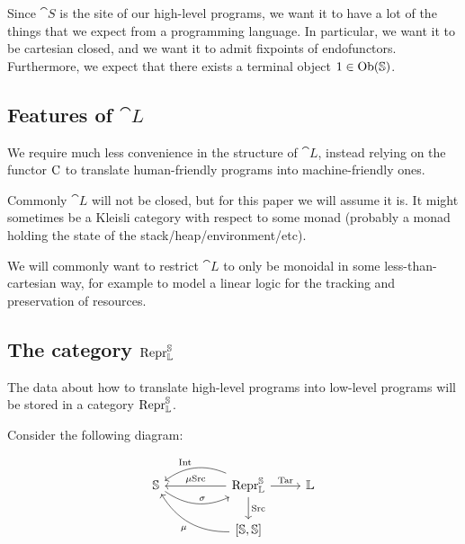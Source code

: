 Since $\cat S$ is the site of our high-level programs, we want it to have a lot
of the things that we expect from a programming language. In particular, we
want it to be cartesian closed, and we want it to admit fixpoints of
endofunctors. Furthermore, we expect that there exists a terminal object $1 \in
  \mathrm{Ob}(\mathbb S)$.

\subsection{Features of $\cat L$}

We require much less convenience in the structure of $\cat L$, instead relying
on the functor $\mathrm C$ to translate human-friendly programs into
machine-friendly ones.

Commonly $\cat L$ will not be closed, but for this paper we will assume it is.
It might sometimes be a Kleisli category with respect to some monad (probably a
monad holding the state of the stack/heap/environment/etc).

We will commonly want to restrict $\cat L$ to only be monoidal in some
less-than-cartesian way, for example to model a linear logic for the tracking
and preservation of resources.

\subsection{The category $\mathrm{Repr} _{\mathbb L} ^{\mathbb S}$}

The data about how to translate high-level programs into low-level programs
will be stored in a category $\mathrm{Repr} _{\mathbb L} ^{\mathbb S}$.

Consider the following diagram:

\begin{equation}
  \begin{tikzcd}
    \cat S \arrow[r, bend right, "\sigma"] & [25pt] \Repr _{\cat L} ^{\cat S} \arrow[l, bend right, swap, "\fun {Int}"] \arrow[l, swap, "\mu \fun {Src}"] \arrow[r, "\fun {Tar}"] \arrow[d, "\fun {Src}"] & \cat L \\
    & {[\cat S, \cat S]} \arrow[ul, bend left, "\mu"] &
  \end{tikzcd}
\end{equation}

